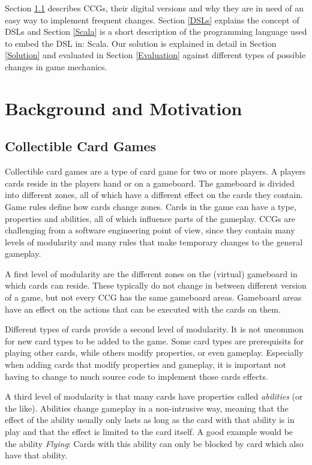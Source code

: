 \documentclass[twocolumn]{phdsymp}
\begin{document}
Section \ref{CCGs} describes CCGs, their digital versions and why they are in need of an easy way to implement frequent changes. Section \ref{DSLs} explains the concept of DSLs and Section \ref{Scala} is a short description of the programming language used to embed the DSL in: Scala.
Our solution is explained in detail in Section \ref{Solution} and evaluated in Section \ref{Evaluation} against different types of possible changes in game mechanics.

\section{Background and Motivation}
\label{Background and Motivation}
\subsection{Collectible Card Games}
\label{CCGs}
Collectible card games are a type of card game for two or more players. A players cards reside in the players hand or on a gameboard. The gameboard is divided into different zones, all of which have a different effect on the cards they contain. Game rules define how cards change zones. Cards in the game can have a type, properties and abilities, all of which influence parts of the gameplay. CCGs are challenging from a software engineering point of view, since they contain many levels of modularity and many rules that make temporary changes to the general gameplay.

A first level of modularity are the different zones on the (virtual) gameboard in which cards can reside. These typically do not change in between different version of a game, but not every CCG has the same gameboard areas. Gameboard areas have an effect on the actions that can be executed with the cards on them.

Different types of cards provide a second level of modularity. It is not uncommon for new card types to be added to the game. Some card types are prerequisits for playing other cards, while others modify properties, or even gameplay. Especially when adding cards that modify properties and gameplay, it is important not having to change to much source code to implement those cards effects.

A third level of modularity is that many cards have properties called \textit{abilities} (or the like). Abilities change gameplay in a non-intrusive way, meaning that the effect of the ability usually only lasts as long as the card with that ability is in play and that the effect is limited to the card itself. A good example would be the ability \textit{Flying}: Cards with this ability can only be blocked by card which also have that ability.
\end{document}
